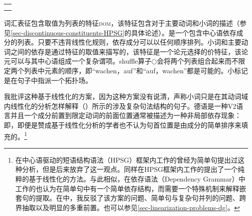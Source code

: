 \begin{exe}
\begin{xlist}[iv.]
\begin{exe}
\begin{xlist}[iv.]
\begin{tabular}{@{}l@{}}
{{{                    }
            }\\
}
\end{tabular}
\zs
词汇表征包含取值为列表的特征\textsc{dom}，该特征包含对于主要动词和小词的描述（参见\ref{sec-discontinuous-constituents-HPSG}的具体论述）。\domlc 是一个包含中心语依存成分的列表。只要不违背线性化规则，依存成分可以以任何顺序排列\citep{Reape94a}。小词和主要动词之间的依存是通过特征\vcompc 的取值来描写的，该特征是一个论元选择的价特征，该论元可以与其中心语组成一个复杂谓项。shuffle算子$\bigcirc$会将两个列表组合起来而不限定两个列表中元素的顺序，即“wachen，auf”和“auf，wachen”都是可能的。小标记是在句子中指派一个拓扑场。

我批评这种基于线性化的方案，因为这种方案没有说清，声称小词只是在其动词域内线性化的分析怎样解释（）所示的涉及复杂句法结构的句子\citep{Mueller2007d}。德语是一种V2语言并且一个成分前置到限定动词的前面位置通常被描述为一种非局部依存现象：即，即便是赞成基于线性化分析的学者也不认为句首位置是由成分的简单排序来填充的\citep{Kathol2000a,Mueller99a,Mueller2002b,TBjerre2006a}。\footnote{
  在中心语驱动的短语结构语法\indexhpsgc（HPSG）框架内工作的\citet[\S~6.3]{Kathol95a}曾经为简单句提出过这种分析，但是后来放弃了这一观点。同样在HPSG框架内工作的\citet{Wetta2011a}提出了一个纯粹的基于线性化的方法。与此相似，在依存语法\indexdgc（Dependency Grammar）中工作的\citet{GO2009a}也认为在简单句中有一个简单依存结构，而需要一个特殊机制来解释嵌套句的提取。在中，我反驳了该方案的问题、简单句与复杂句并列的问题、跨界抽取以及明显的多重前置。也可以参见\ref{sec-linearization-problems-dg}。
}


\end{xlist}
\end{exe}
\end{xlist}
\end{exe}
